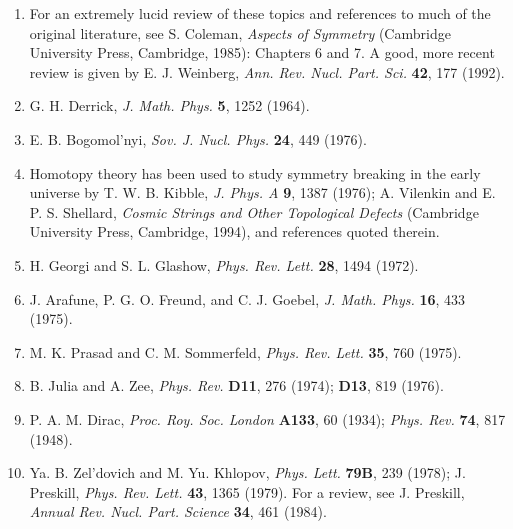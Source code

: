 \begin{enumerate}
\item {}\label{ch23-ref-8}
For an extremely lucid review of these topics and references to much of
the original literature, see S. Coleman, \emph{Aspects of Symmetry}
(Cambridge University Press, Cambridge, 1985): Chapters 6 and 7. A good,
more recent review is given by E. J. Weinberg, \emph{Ann. Rev. Nucl.
Part. Sci.} \textbf{42}, 177 (1992).

\item {}\label{ch23-ref-9}
G. H. Derrick, \emph{J. Math. Phys.} \textbf{5}, 1252 (1964).

\item {}\label{ch23-ref-10}
E. B. Bogomol'nyi, \emph{Sov. J. Nucl. Phys.} \textbf{24}, 449 (1976).

\item {}\label{ch23-ref-11}
Homotopy theory has been used to study symmetry breaking in the early
universe by T. W. B. Kibble, \emph{J. Phys. A} \textbf{9}, 1387 (1976);
A. Vilenkin and E. P. S. Shellard, \emph{Cosmic Strings and Other
Topological Defects} (Cambridge University Press, Cambridge, 1994), and
references quoted therein.

\item {}\label{ch23-ref-12}
H. Georgi and S. L. Glashow, \emph{Phys. Rev. Lett.} \textbf{28}, 1494
(1972).

\item {}\label{ch23-ref-13}
J. Arafune, P. G. O. Freund, and C. J. Goebel, \emph{J. Math. Phys.}
\textbf{16}, 433 (1975).

\item {}\label{ch23-ref-14}
M. K. Prasad and C. M. Sommerfeld, \emph{Phys. Rev. Lett.} \textbf{35},
760 (1975).

\item {}\label{ch23-ref-15}
B. Julia and A. Zee, \emph{Phys. Rev.} \textbf{D11}, 276 (1974);
\textbf{D13}, 819 (1976).

\item {}\label{ch23-ref-16}
P. A. M. Dirac, \emph{Proc. Roy. Soc. London} \textbf{A133}, 60 (1934);
\emph{Phys. Rev.} \textbf{74}, 817 (1948).

\item {}\label{ch23-ref-17}
Ya. B. Zel'dovich and M. Yu. Khlopov, \emph{Phys. Lett.} \textbf{79B},
239 (1978); J. Preskill, \emph{Phys. Rev. Lett.} \textbf{43}, 1365
(1979). For a review, see J. Preskill, \emph{Annual Rev. Nucl. Part.
Science} \textbf{34}, 461 (1984).


\end{enumerate}
